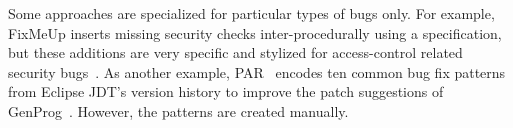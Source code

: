 
Some approaches are specialized for particular types of bugs only. For example, FixMeUp inserts missing security checks inter-procedurally using a specification, but these additions are very specific and stylized for access-control related security bugs~\cite{son2013fix}. As another example, PAR~\cite{Kim2013:PAR} encodes ten common bug fix patterns from Eclipse JDT's version history to improve the patch suggestions of GenProg~\cite{Weimer2009:AFP}. However, the patterns are created manually. 

